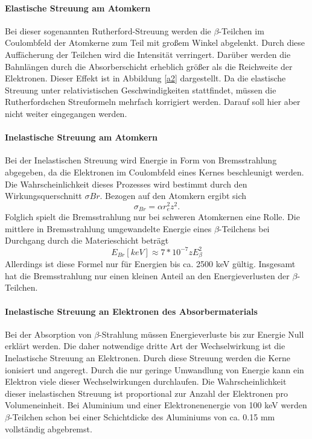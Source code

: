\documentclass[11pt,ngerman,a4paper]{article}
\begin{document}
\paragraph{Elastische Streuung am Atomkern}
Bei dieser sogenannten Rutherford-Streuung werden die $\beta$-Teilchen im Coulombfeld der Atomkerne zum Teil mit großem Winkel abgelenkt. Durch diese Auffächerung der Teilchen wird die Intensität verringert. Darüber werden die Bahnlängen durch die Absorberschicht erheblich größer als die Reichweite der Elektronen. Dieser Effekt ist in Abbildung \ref{a2} dargestellt. Da die elastische Streuung unter relativistischen Geschwindigkeiten stattfindet, müssen die Rutherfordschen Streuformeln mehrfach korrigiert werden. Darauf soll hier aber nicht weiter eingegangen werden.
\paragraph{Inelastische Streuung am Atomkern}
Bei der Inelastischen Streuung wird Energie in Form von Bremsstrahlung abgegeben, da die Elektronen im Coulombfeld eines Kernes beschleunigt werden. Die Wahrscheinlichkeit dieses Prozesses wird bestimmt durch den Wirkungsquerschnitt $\sigma{Br}$. Bezogen auf den Atomkern ergibt sich
\begin{equation}
\sigma_{Br} = \alpha r_e^2 z^2.
\label{8}
\end{equation}
Folglich spielt die Bremsstrahlung nur bei schweren Atomkernen eine Rolle. Die mittlere in Bremsstrahlung umgewandelte Energie eines $\beta$-Teilchens bei Durchgang durch die Materieschicht beträgt
\begin{equation}
E_{Br}[keV] \approx 7*10^{-7}zE_{\beta}^2
\label{9}
\end{equation}
Allerdings ist diese Formel nur für Energien bis ca. 2500 keV gültig. Insgesamt hat die Bremsstrahlung nur einen kleinen Anteil an den Energieverlusten der $\beta$-Teilchen.
\paragraph{Inelastische Streuung an Elektronen des Absorbermaterials}
Bei der Absorption von $\beta$-Strahlung müssen Energieverluste bis zur Energie Null erklärt werden. Die daher notwendige dritte Art der Wechselwirkung ist die Inelastische Streuung an Elektronen. Durch diese Streuung werden die Kerne ionisiert und angeregt. Durch die nur geringe Umwandlung von Energie kann ein Elektron viele dieser Wechselwirkungen durchlaufen. Die Wahrscheinlichkeit dieser inelastischen Streuung ist proportional zur Anzahl der Elektronen pro Volumeneinheit. Bei Aluminium und einer Elektronenenergie von 100 keV werden $\beta$-Teilchen schon bei einer Schichtdicke des Aluminiums von ca. 0.15 mm vollständig abgebremst.
\end{document}
